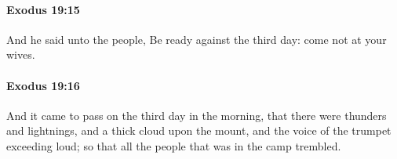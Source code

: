 		\paragraph{Exodus 19:15} %
			\label{EXODUS-19-15}

			And he said unto the people, Be ready against the third day: come not at your wives.


		\paragraph{Exodus 19:16} %
			\label{EXODUS-19-16}

			And it came to pass on the third day in the morning, that there were thunders and lightnings, and a thick cloud upon the mount, and the voice of the trumpet exceeding loud; so that all the people that was in the camp trembled.


